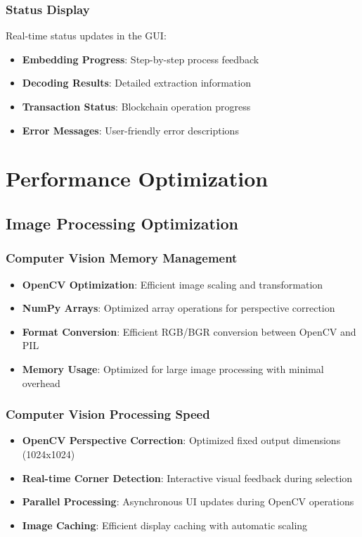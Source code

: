 \documentclass[12pt,a4paper]{article}
\begin{document}
\subsubsection{Status Display}
Real-time status updates in the GUI:
\begin{itemize}
    \item \textbf{Embedding Progress}: Step-by-step process feedback
    \item \textbf{Decoding Results}: Detailed extraction information
    \item \textbf{Transaction Status}: Blockchain operation progress
    \item \textbf{Error Messages}: User-friendly error descriptions
\end{itemize}

\section{Performance Optimization}

\subsection{Image Processing Optimization}

\subsubsection{Computer Vision Memory Management}
\begin{itemize}
    \item \textbf{OpenCV Optimization}: Efficient image scaling and transformation
    \item \textbf{NumPy Arrays}: Optimized array operations for perspective correction
    \item \textbf{Format Conversion}: Efficient RGB/BGR conversion between OpenCV and PIL
    \item \textbf{Memory Usage}: Optimized for large image processing with minimal overhead
\end{itemize}

\subsubsection{Computer Vision Processing Speed}
\begin{itemize}
    \item \textbf{OpenCV Perspective Correction}: Optimized fixed output dimensions (1024x1024)
    \item \textbf{Real-time Corner Detection}: Interactive visual feedback during selection
    \item \textbf{Parallel Processing}: Asynchronous UI updates during OpenCV operations
    \item \textbf{Image Caching}: Efficient display caching with automatic scaling
\end{itemize}
\end{document}
